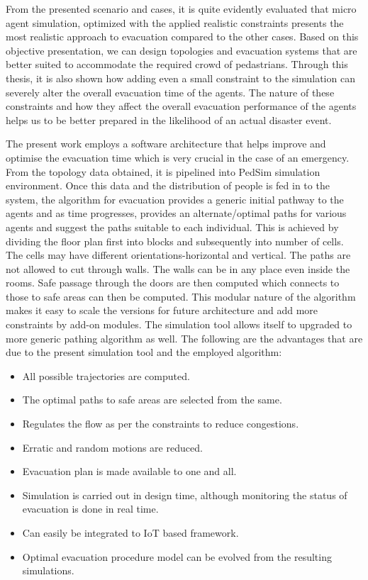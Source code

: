 From the presented scenario and cases, it is quite evidently evaluated that micro agent simulation, optimized with the applied realistic constraints presents the most realistic approach to evacuation compared to the other cases. Based on this objective presentation, we can design topologies and evacuation systems that are better suited to accommodate the required crowd of pedastrians. Through this thesis, it is also shown how adding even a small constraint to the simulation can severely alter the overall evacuation time of the agents. The nature of these constraints and how they affect the overall evacuation performance of the agents helps us to be better prepared in the likelihood of an actual disaster event.    

The present work employs a software architecture that helps improve and optimise the evacuation time which is very crucial in the case of an emergency. From the topology data obtained, it is pipelined into PedSim simulation environment. Once this data and the distribution of people is fed in to the system, the algorithm for evacuation provides a generic initial pathway to the agents and as time progresses, provides an alternate/optimal paths for various agents and suggest the paths suitable to each individual. This is achieved by dividing the floor plan first into blocks and subsequently into number of cells. The cells may have different orientations-horizontal and vertical. The paths are not allowed to cut through walls. The walls can be in any place even inside the rooms. Safe passage through the doors are then computed which connects to those to safe areas can then be computed. This modular nature of the algorithm makes it easy to scale the versions for future architecture and add more constraints by add-on modules. The simulation tool allows itself to upgraded to more generic pathing algorithm as well.  The following are the advantages that are due to the present simulation tool and the employed algorithm:

\begin{itemize}
\item All possible trajectories are computed.
\item The optimal paths to safe areas are selected from the same.
\item Regulates the flow as per the constraints to reduce congestions.
\item Erratic and random  motions are reduced.
\item Evacuation plan is made available to one and all.
\item Simulation is carried out in design time, although monitoring the status of evacuation is done in real time.
\item Can easily be integrated to IoT based framework.
\item Optimal evacuation procedure model can be evolved from the resulting simulations.
\end{itemize}

